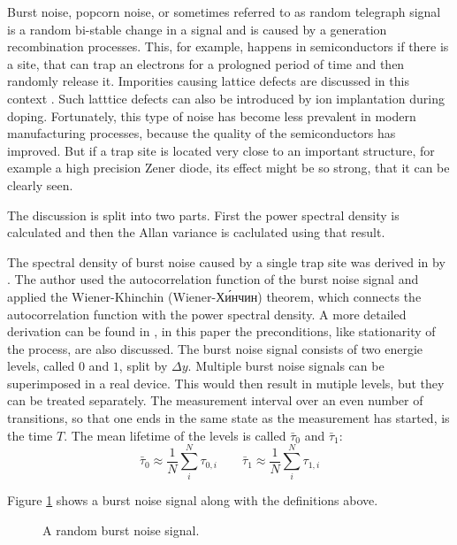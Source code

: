 Burst noise, popcorn noise, or sometimes referred to as random telegraph signal is a random bi-stable change in a signal and is caused by a generation recombination processes. This, for example, happens in semiconductors if there is a site, that can trap an electrons for a prologned period of time and then randomly release it. Imporities causing lattice defects are discussed in this context \cite{kay2012operational,burst_noise_psd,popcorn_noise_orgin,technote_ti_popcorn_noise}. Such latttice defects can also be introduced by ion implantation during doping. Fortunately, this type of noise has become less prevalent in modern manufacturing processes, because the quality of the semiconductors has improved. But if a trap site is located very close to an important structure, for example a high precision Zener diode, its effect might be so strong, that it can be clearly seen.

The discussion is split into two parts. First the power spectral density is calculated and then the Allan variance is caclulated using that result.

The spectral density of burst noise caused by a single trap site was derived in \cite{burst_noise_wiener_khinchin} by \citeauthor{burst_noise_wiener_khinchin}. The author used the autocorrelation function of the burst noise signal and applied the Wiener-Khinchin (Wiener-Хи́нчин) theorem, which connects the autocorrelation function with the power spectral density. A more detailed derivation can be found in \cite{fundamentals_of_noise_processes}, in this paper the preconditions, like stationarity of the process, are also discussed. The burst noise signal consists of two energie levels, called $0$ and $1$, split by $\Delta y$. Multiple burst noise signals can be superimposed in a real device. This would then result in mutiple levels, but they can be treated separately. The measurement interval over an even number of transitions, so that one ends in the same state as the measurement has started, is the time $T$. The mean lifetime of the levels is called $\bar \tau_0$ and $\bar \tau_1$:
\begin{equation}
    \bar \tau_{0} \approx \frac 1 N \sum_{i}^N \tau_{0,i} \qquad \bar \tau_{1} \approx \frac 1 N \sum_{i}^N \tau_{1,i}
\end{equation}

Figure \ref{fig:burst_noise} shows a burst noise signal along with the definitions above.

\begin{figure}[h]
    \centering
    \caption{A random burst noise signal.}
    \label{fig:burst_noise}
\end{figure}

